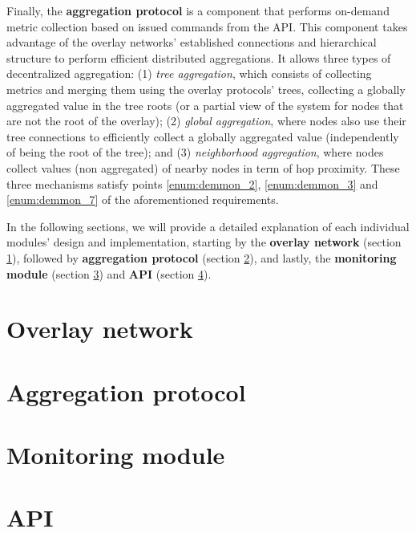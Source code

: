 Finally, the \textbf{aggregation protocol} is a component that performs on-demand metric collection based on issued commands from the API. This component takes advantage of the overlay networks' established connections and hierarchical structure to perform efficient distributed aggregations. It allows three types of decentralized aggregation: (1) \textit{tree aggregation}, which consists of collecting metrics and merging them using the overlay protocols' trees, collecting a globally aggregated value in the tree roots (or a partial view of the system for nodes that are not the root of the overlay); (2) \textit{global aggregation}, where nodes also use their tree connections to efficiently collect a globally aggregated value (independently of being the root of the tree); and (3) \textit{neighborhood aggregation}, where nodes collect values (non aggregated) of nearby nodes in term of hop proximity. These three mechanisms satisfy points \ref{enum:demmon_2}, \ref{enum:demmon_3} and \ref{enum:demmon_7} of the aforementioned requirements. 

In the following sections, we will provide a detailed explanation of each individual modules' design and implementation, starting by the \textbf{overlay network} (section \ref{sec:overlay_network}), followed by \textbf{aggregation protocol} (section \ref{sec:mon_protocol}), and lastly, the \textbf{monitoring module} (section \ref{sec:mon_module}) and \textbf{API} (section \ref{sec:api}). 

\section{Overlay network} 
\label{sec:overlay_network}


\section{Aggregation protocol}
\label{sec:mon_protocol}


\section{Monitoring module}
\label{sec:mon_module}


\section{API}
\label{sec:api}


